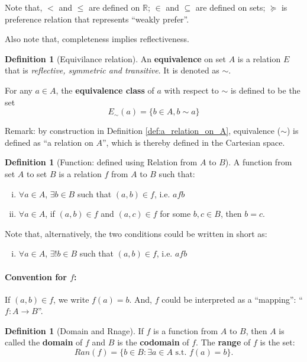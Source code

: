 \documentclass[12pt]{article}
\newcommand{\R}{{\mathbb R}}
\theoremstyle{definition}
\newtheorem{definition}[theorem]{Definition}
\theoremstyle{plain}
\begin{document}
Note that, $<$ and $\le$ are defined on $\R$; $\in$ and $\subseteq$ are
defined on sets; $\succeq$ is preference relation that represents ``weakly
prefer''.

Also note that, completeness implies reflectiveness.

\begin{definition}
    [Equivilance relation]

    An \textbf{equivalence} on set $A$ is a relation $E$ that is
    \emph{reflective, symmetric and transitive}. It is denoted as $\sim$.

    For any $a \in A$, the \textbf{equivalence class} of $a$ with respect to
    $\sim$ is defined to be the set
    \[E_\sim(a) = \{ b \in A, b\sim a\}\]
\end{definition}

Remark: by construction in Definition \ref{def:a_relation_on_A},  equivalence
($\sim$) is defined as ``a relation on $A$'', which is thereby defined in the
Cartesian space.

\begin{definition}
    [Function: defined using Relation from $A$ to $B$]
    A function from set $A$ to set $B$ is a relation $f$ from $A$ to $B$ such
    that:
    \begin{enumerate}[(i)]
        \item $\forall a \in A$, $\exists b \in B$ such that $(a,b) \in f$, i.e.
            $a f b$
        \item $\forall a \in A$, if $(a,b) \in f$ and $(a,c) \in f$ for some $b,
            c \in B$, then $b = c$.
    \end{enumerate}

    Note that, alternatively, the two conditions could be written in short as:
    \begin{enumerate}[(iii)]
        \item $\forall a \in A$, $\exists ! b \in B$ such that $(a,b) \in f$, i.e.
            $a f b$
    \end{enumerate}

\end{definition}
\paragraph{Convention for $f$:} If $(a,b) \in f$, we write $f(a) = b$. And, $f$
could be interpreted as a ``mapping'': ``$f: A\to B$''.

\begin{definition}[Domain and Rnage]
    If $f$ is a function from $A$ to $B$, then $A$ is called the
    \textbf{domain } of $f$ and $B$ is the \textbf{codomain} of $f$. The
    \textbf{range} of $f$ is the set:
    \[
        Ran (f) = \{ b \in B: \exists a \in A
        \text{ s.t. } f(a) = b\}.
    \]
\end{definition}
\end{document}
